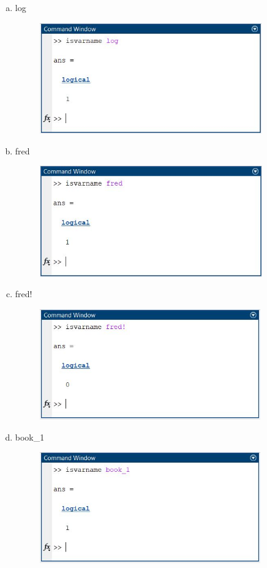 \documentclass{article}
\begin{document}
\begin{enumerate}[a)]
\begin{figure}[H]
        \end{figure}
    \item log
        \begin{figure}[H]
        \centering
        \includegraphics[height=4.8cm]{img6l.jpg}
        \end{figure}
    \item fred
        \begin{figure}[H]
        \centering
        \includegraphics[height=4.8cm]{img6m.jpg}
        \end{figure}
    \item fred!
        \begin{figure}[H]
        \centering
        \includegraphics[height=4.8cm]{img6n.jpg}
        \end{figure}
    \item book\_1
        \begin{figure}[H]
        \centering
        \includegraphics[height=4.8cm]{img6x.jpg}

\end{figure}
\end{enumerate}
\end{document}
